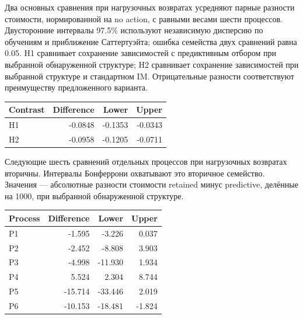 Два основных сравнения при нагрузочных возвратах усредняют парные разности стоимости, нормированной на no action, с равными весами шести процессов. Двусторонние интервалы 97.5\% используют независимую дисперсию по обучениям и приближение Саттертуэйта; ошибка семейства двух сравнений равна 0.05. H1 сравнивает сохранение зависимостей с предиктивным отбором при выбранной обнаруженной структуре; H2 сравнивает сохранение зависимостей при выбранной структуре и стандартном IM. Отрицательные разности соответствуют преимуществу предложенного варианта.

\begin{center}\small\begin{tabular}{lrrr}\toprule

Contrast & Difference & Lower & Upper\\\midrule

H1 & -0.0848 & -0.1353 & -0.0343\\

H2 & -0.0958 & -0.1205 & -0.0711\\

\bottomrule\end{tabular}\end{center}

Следующие шесть сравнений отдельных процессов при нагрузочных возвратах вторичны. Интервалы Бонферрони охватывают это вторичное семейство. Значения — абсолютные разности стоимости retained минус predictive, делённые на 1000, при выбранной обнаруженной структуре.

\begin{center}\small\begin{tabular}{lrrr}\toprule

Process & Difference & Lower & Upper\\\midrule

P1 & -1.595 & -3.226 & 0.037\\

P2 & -2.452 & -8.808 & 3.903\\

P3 & -4.998 & -11.930 & 1.934\\

P4 & 5.524 & 2.304 & 8.744\\

P5 & -15.714 & -33.446 & 2.019\\

P6 & -10.153 & -18.481 & -1.824\\

\bottomrule\end{tabular}\end{center}

